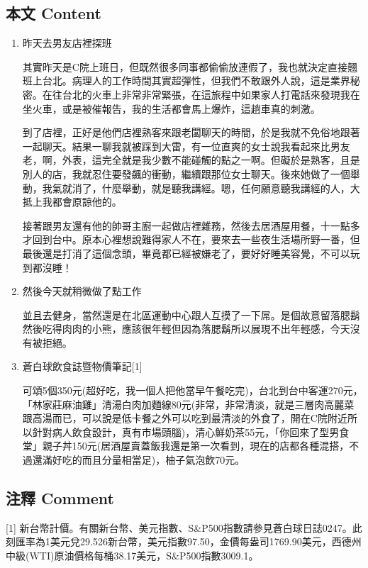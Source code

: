 \documentclass[a5paper, 11pt
]{book}
\begin{document}
\hypertarget{ux672cux6587-content-22}{%
\subsection{本文 Content}\label{ux672cux6587-content-22}}

\begin{enumerate}
\def\labelenumi{\arabic{enumi}.}
\item
  昨天去男友店裡探班

  其實昨天是C院上班日，但既然很多同事都偷偷放連假了，我也就決定直接翹班上台北。病理人的工作時間其實超彈性，但我們不敢跟外人說，這是業界秘密。在往台北的火車上非常非常緊張，在這旅程中如果家人打電話來發現我在坐火車，或是被催報告，我的生活都會馬上爆炸，這趟車真的刺激。

  到了店裡，正好是他們店裡熟客來跟老闆聊天的時間，於是我就不免俗地跟著一起聊天。結果一聊我就被踩到大雷，有一位直爽的女士說我看起來比男友老，啊，外表，這完全就是我少數不能碰觸的點之一啊。但礙於是熟客，且是別人的店，我就忍住要發飆的衝動，繼續跟那位女士聊天。後來她做了一個舉動，我氣就消了，什麼舉動，就是聽我講經。嗯，任何願意聽我講經的人，大抵上我都會原諒他的。

  接著跟男友還有他的帥哥主廚一起做店裡雜務，然後去居酒屋用餐，十一點多才回到台中。原本心裡想說難得家人不在，要來去一些夜生活場所野一番，但最後還是打消了這個念頭，畢竟都已經被嫌老了，要好好睡美容覺，不可以玩到都沒睡！
\item
  然後今天就稍微做了點工作

  並且去健身，當然還是在北區運動中心跟人互摸了一下屌。是個故意留落腮鬍然後吃得肉肉的小熊，應該很年輕但因為落腮鬍所以展現不出年輕感，今天沒有被拒絕。
\item
  蒼白球飲食誌暨物價筆記{[}1{]}

  可頌5個350元(超好吃，我一個人把他當早午餐吃完)，台北到台中客運270元，「林家莊麻油雞」清湯白肉加麵線80元(非常，非常清淡，就是三層肉高麗菜跟高湯而已，可以說是低卡餐之外可以吃到最清淡的外食了，開在C院附近所以針對病人飲食設計，真有市場頭腦)，清心鮮奶茶55元，「你回來了型男食堂」親子丼150元(居酒屋賣蓋飯我還是第一次看到，現在的店都各種混搭，不過還滿好吃的而且分量相當足)，柚子氣泡飲70元。
\end{enumerate}

\hypertarget{ux6ce8ux91cb-comment-22}{%
\subsection{注釋 Comment}\label{ux6ce8ux91cb-comment-22}}

{[}1{]}
新台幣計價。有關新台幣、美元指數、S\&P500指數請參見蒼白球日誌0247。此刻匯率為1美元兌29.526新台幣，美元指數97.50，金價每盎司1769.90美元，西德州中級(WTI)原油價格每桶38.17美元，S\&P500指數3009.1。
\end{document}
